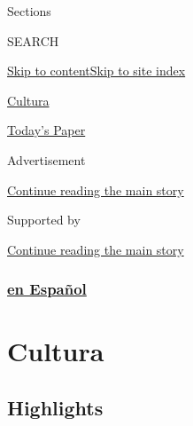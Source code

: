 Sections

SEARCH

\protect\hyperlink{site-content}{Skip to
content}\protect\hyperlink{site-index}{Skip to site index}

\href{https://www.nytimes.com/es/section/cultura}{Cultura}

\href{https://myaccount.nytimes.com/auth/login?response_type=cookie\&client_id=vi}{}

\href{https://www.nytimes.com/section/todayspaper}{Today's Paper}

Advertisement

\protect\hyperlink{after-top}{Continue reading the main story}

Supported by

\protect\hyperlink{after-sponsor}{Continue reading the main story}

\hypertarget{en-espauxf1ol}{%
\subsubsection{\texorpdfstring{\href{/es/}{en
Español}}{en Español}}\label{en-espauxf1ol}}

\hypertarget{cultura}{%
\section{Cultura}\label{cultura}}

\hypertarget{highlights}{%
\subsection{Highlights}\label{highlights}}

